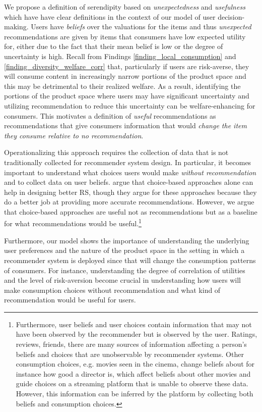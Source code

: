 \documentclass[sigconf]{acmart}
\begin{document}
We propose a definition of serendipity based on \textit{unexpectedness} and \textit{usefulness} which have have clear definitions in the context of our model of user decision-making. Users have \textit{beliefs} over the valuations for the items and thus \textit{unexpected} recommendations are given by items that consumers have low expected utility for, either due to the fact that their mean belief is low or the degree of uncertainty is high. Recall from Findings \ref{finding_local_consumption} and \ref{finding_diversity_welfare_corr} that, particularly if users are risk-averse, they will consume content in increasingly narrow portions of the product space and this may be detrimental to their realized welfare. As a result, identifying the portions of the product space where users may have significant uncertainty and utilizing recommendation to reduce this uncertainty can be welfare-enhancing for consumers. This motivates a definition of \textit{useful} recommendations as recommendations that give consumers information that would \textit{change the item they consume relative to no recommendation}.

Operationalizing this approach requires the collection of data that is not traditionally collected for recommender system design. In particular, it becomes important to understand what choices users would make \textit{without recommendation} and to collect data on user beliefs. \cite{jiang2014choice, saavedra2016choice} argue that choice-based approaches alone can help in designing better RS, though they argue for these approaches because they do a better job at providing more accurate recommendations. However, we argue that choice-based approaches are useful not as recommendations but as a baseline for what recommendations would be useful.\footnote{Furthermore, user beliefs and user choices contain information that may not have been observed by the recommender but is observed by the user. Ratings, reviews, friends, there are many sources of information affecting a person's beliefs and choices that are unobservable by recommender systems. Other consumption choices, e.g. movies seen in the cinema, change beliefs about for instance how good a director is, which affect beliefs about other movies and guide choices on a streaming platform that is unable to observe these data. However, this information can be inferred by the platform by collecting both beliefs and consumption choices.}

Furthermore, our model shows the importance of understanding the underlying user preferences and the nature of the product space in the setting in which a recommender system is deployed since that will change the consumption patterns of consumers. For instance, understanding the degree of correlation of utilities and the level of risk-aversion become crucial in understanding how users will make consumption choices without recommendation and what kind of recommendation would be useful for users.
\end{document}
